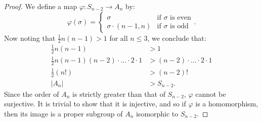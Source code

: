 \documentclass{article}
\begin{document}
\begin{proof}
    We define a map $\varphi: S_{n - 2} \rightarrow A_n$ by:
    \begin{equation*}
        \varphi(\sigma) =
        \begin{cases}
            \sigma      & \text{if $\sigma$ is even} \\
            \sigma \cdot (n - 1, n)  & \text{if $\sigma$ is odd}
        \end{cases}.
    \end{equation*}
    Now noting that $\frac{1}{2}n(n - 1) > 1$ for all $n \leq 3$, we conclude that:
    \begin{align*}
        \frac{1}{2}n(n - 1) & > 1 \\
        \frac{1}{2}n(n - 1)(n - 2) \cdot ... \cdot 2 \cdot 1 & > (n - 2) \cdot ... \cdot 2 \cdot 1 \\
        \frac{1}{2}(n!) & > (n - 2)! \\
        |A_n| & > S_{n - 2}.
    \end{align*}
    Since the order of $A_n$ is strictly greater than that of $S_{n - 2}$, $\varphi$ cannot be surjective. It is trivial to show that it is injective, and so if $\varphi$ is a homomorphism, then its image is a proper subgroup of $A_n$ isomorphic to $S_{n - 2}$.


\end{proof}
\end{document}
